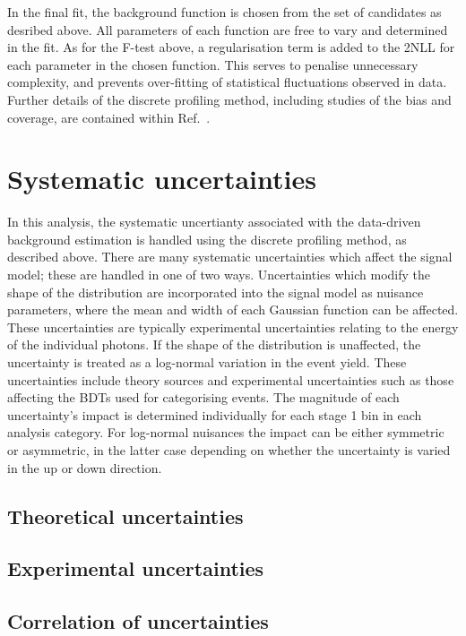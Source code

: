 In the final fit, the background function is chosen from the set of candidates as desribed above.
All parameters of each function are free to vary and determined in the fit.
As for the F-test above, 
a regularisation term is added to the 2NLL for each parameter in the chosen function.
This serves to penalise unnecessary complexity, 
and prevents over-fitting of statistical fluctuations observed in data. %
Further details of the discrete profiling method, 
including studies of the bias and coverage,
are contained within Ref.~\cite{Envelope}.

\section{Systematic uncertainties}

In this analysis, the systematic uncertianty associated with the data-driven background estimation 
is handled using the discrete profiling method, as described above.
There are many systematic uncertainties which affect the signal model; 
these are handled in one of two ways.
Uncertainties which modify the shape of the \mgg distribution are incorporated into the signal model
as nuisance parameters, where the mean and width of each Gaussian function can be affected.
These uncertainties are typically experimental uncertainties 
relating to the energy of the individual photons. 
If the shape of the \mgg distribution is unaffected, 
the uncertainty is treated as a log-normal variation in the event yield.
These uncertainties include theory sources
and experimental uncertainties such as those affecting the BDTs used for categorising events.
The magnitude of each uncertainty's impact is determined individually 
for each stage 1 bin in each analysis category.
For log-normal nuisances the impact can be either symmetric or asymmetric,
in the latter case depending on whether the uncertainty is varied in the up or down direction.

\subsection{Theoretical uncertainties}

\subsection{Experimental uncertainties}

\subsection{Correlation of uncertainties}
